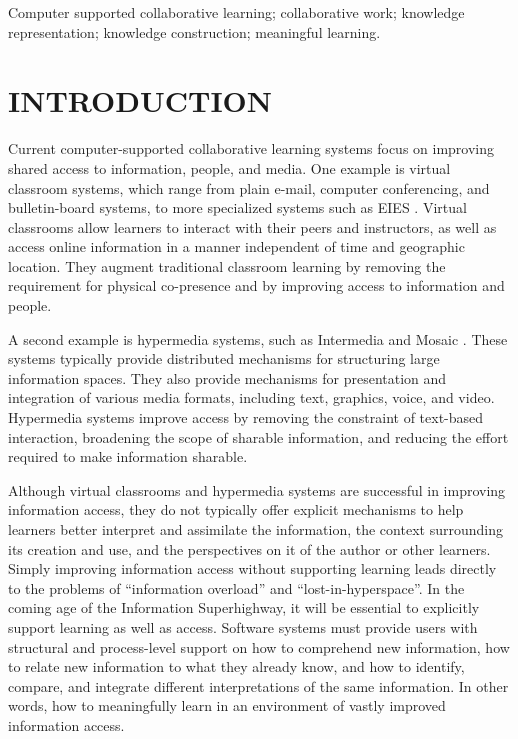 \keywords Computer supported collaborative learning; collaborative work; knowledge
representation; knowledge construction; meaningful learning.


\section{INTRODUCTION}
\label{sec:introduction}

Current computer-supported collaborative learning systems focus on
improving shared access to information, people, and media. One example is
virtual classroom systems, which range from plain e-mail, computer
conferencing, and bulletin-board systems, to more specialized systems such
as EIES \cite{Hiltz88}.  Virtual classrooms allow learners to interact with
their peers and instructors, as well as access online information in a
manner independent of time and geographic location. They augment
traditional classroom learning by removing the requirement for physical
co-presence and by improving access to information and people.

A second example is hypermedia systems, such as Intermedia
\cite{Yankelovich88} and Mosaic \cite{Andreessen93}. These systems
typically provide distributed mechanisms for structuring large information
spaces. They also provide mechanisms for presentation and integration of
various media formats, including text, graphics, voice, and video.
Hypermedia systems improve access by removing the constraint of text-based
interaction, broadening the scope of sharable information, and reducing the
effort required to make information sharable.

Although virtual classrooms and hypermedia systems are successful in
improving information access, they do not typically offer explicit
mechanisms to help learners better interpret and assimilate the
information, the context surrounding its creation and use, and the
perspectives on it of the author or other learners. Simply improving
information access without supporting learning leads directly to the
problems of ``information overload'' and ``lost-in-hyperspace''.  In the
coming age of the Information Superhighway, it will be essential to
explicitly support learning as well as access.  Software systems must
provide users with structural and process-level support on how to
comprehend new information, how to relate new information to what they
already know, and how to identify, compare, and integrate different
interpretations of the same information.  In other words, how to
meaningfully learn in an environment of vastly improved information access.

